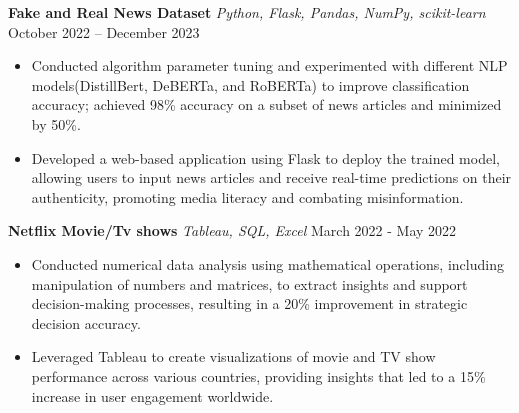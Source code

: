\documentclass{article}
\begin{document}
\noindent \textbf{Fake and Real News Dataset} \textit{Python, Flask, Pandas, NumPy, scikit-learn} \hfill  October 2022 – December 2023
\begin{itemize}[noitemsep,nolistsep,leftmargin=*]
\item {Conducted algorithm parameter tuning and experimented with different NLP models(DistillBert, DeBERTa, and RoBERTa) to improve
classification accuracy; achieved 98\% accuracy on a subset of news articles and minimized by 50\%.}
\item {Developed a web-based application using Flask to deploy the trained model, allowing users to input news articles and receive real-time predictions on their authenticity, promoting media literacy and combating misinformation.}
\end{itemize}

\noindent \textbf{Netflix Movie/Tv shows} \textit{Tableau, SQL, Excel} \hfill  March 2022 - May 2022
\begin{itemize}[noitemsep,nolistsep,leftmargin=*]
\item {Conducted numerical data analysis using mathematical operations, including manipulation of numbers and matrices, to extract insights and support decision-making processes, resulting in a 20\% improvement in strategic decision accuracy.}
\item {Leveraged Tableau to create visualizations of movie and TV show performance across various countries, providing insights that led to a 15\% increase in user engagement worldwide.}
\end{itemize}





\end{document}
